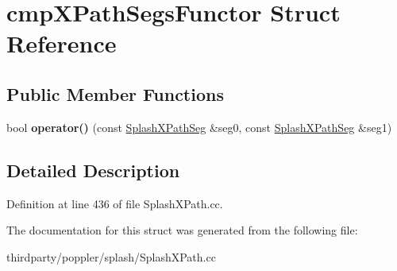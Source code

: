 \hypertarget{structcmp_x_path_segs_functor}{}\section{cmp\+X\+Path\+Segs\+Functor Struct Reference}
\label{structcmp_x_path_segs_functor}
\subsection*{Public Member Functions}
\begin{DoxyCompactItemize}
\item 
\mbox{\label{structcmp_x_path_segs_functor_a9b4a8c51bce32242479b7699746b0098}} 
bool {\bfseries operator()} (const \hyperlink{struct_splash_x_path_seg}{Splash\+X\+Path\+Seg} \&seg0, const \hyperlink{struct_splash_x_path_seg}{Splash\+X\+Path\+Seg} \&seg1)
\end{DoxyCompactItemize}


\subsection{Detailed Description}


Definition at line 436 of file Splash\+X\+Path.\+cc.



The documentation for this struct was generated from the following file\+:\begin{DoxyCompactItemize}
\item 
thirdparty/poppler/splash/Splash\+X\+Path.\+cc\end{DoxyCompactItemize}
